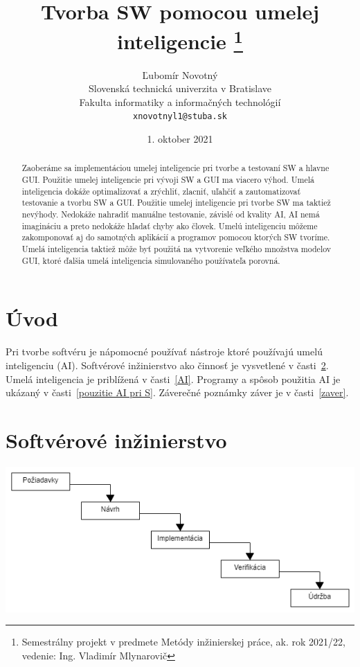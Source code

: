 \documentclass[10pt,twoside,slovak,a4paper]{article}
\title{Tvorba SW pomocou umelej inteligencie
\thanks{Semestrálny projekt v predmete Metódy inžinierskej práce, ak. rok 2021/22, vedenie: Ing. Vladimír Mlynarovič}} %
\author{Ľubomír Novotný\\[2pt]
	{\small Slovenská technická univerzita v Bratislave}\\
	{\small Fakulta informatiky a informačných technológií}\\
	{\small \texttt{xnovotnyl1@stuba.sk}}
	}
\date{\small 1. oktober 2021} %
\begin{document}
\maketitle

\begin{abstract}
Zaoberáme sa implementáciou umelej inteligencie pri tvorbe a testovaní SW a hlavne GUI. Použitie umelej inteligencie pri vývoji SW a GUI ma viacero výhod. Umelá inteligencia dokáže optimalizovať a zrýchliť, zlacniť, uľahčiť a zautomatizovať  testovanie a tvorbu SW a GUI. Použitie umelej inteligencie pri tvorbe SW ma taktiež nevýhody. Nedokáže nahradiť manuálne testovanie, závislé od kvality AI, AI nemá imagináciu a preto nedokáže hľadať chyby ako človek. Umelú inteligenciu môžeme zakomponovať aj do samotných aplikácií a programov pomocou ktorých SW tvoríme. Umelá inteligencia taktiež môže byť použitá na vytvorenie veľkého množstva modelov GUI, ktoré ďalšia umelá inteligencia simulovaného používateľa porovná.
\end{abstract}

\section{Úvod}

Pri tvorbe softvéru je nápomocné používať nástroje ktoré používajú umelú inteligenciu (AI). Softvérové inžinierstvo ako činnosť je vysvetlené v časti~\ref{SWE}. Umelá inteligencia je priblížená v časti~\ref{AI}. Programy a spôsob použitia AI je ukázaný v časti~\ref{pouzitie AI pri S}. Záverečné poznámky záver je v časti~\ref{zaver}.

\section{Softvérové inžinierstvo} \label{SWE}

\includegraphics[scale=0.6]{vodopad1}

 
\end{document}
